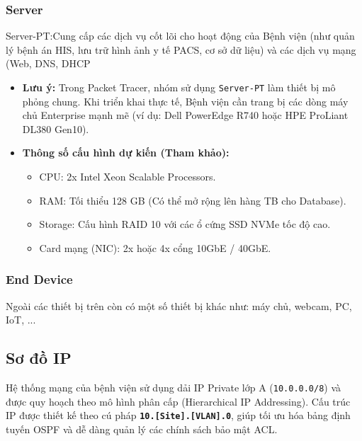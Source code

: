 \subsubsection{Server}
Server-PT:Cung cấp các dịch vụ cốt lõi cho hoạt động của Bệnh viện (như quản lý bệnh án HIS, lưu trữ hình ảnh y tế PACS, cơ sở dữ liệu) và các dịch vụ mạng (Web, DNS, DHCP
\begin{tcolorbox}[
        enhanced,
        colback=white,
        colframe=darkgray,
        coltitle=black,
        fonttitle=\large\bfseries,
        title=Thông số kỹ thuật đề xuất cho Server (Thực tế),
        attach boxed title to top left={xshift=5mm, yshift=-3mm},
        boxed title style={colback=white, colframe=darkgray},
        drop fuzzy shadow,
        top=4mm, bottom=2mm, left=2mm, right=2mm
    ]
        \begin{itemize}
            \item \textbf{Lưu ý:} Trong Packet Tracer, nhóm sử dụng \texttt{Server-PT} làm thiết bị mô phỏng chung. Khi triển khai thực tế, Bệnh viện cần trang bị các dòng máy chủ Enterprise mạnh mẽ (ví dụ: Dell PowerEdge R740 hoặc HPE ProLiant DL380 Gen10).
            \item \textbf{Thông số cấu hình dự kiến (Tham khảo):}
            \begin{itemize}
                \item CPU: 2x Intel Xeon Scalable Processors.
                \item RAM: Tối thiểu 128 GB (Có thể mở rộng lên hàng TB cho Database).
                \item Storage: Cấu hình RAID 10 với các ổ cứng SSD NVMe tốc độ cao.
                \item Card mạng (NIC): 2x hoặc 4x cổng 10GbE / 40GbE.
            \end{itemize}
        \end{itemize}
    \end{tcolorbox}

\subsubsection{End Device}
Ngoài các thiết bị trên còn có một số thiết bị khác như: máy chủ, webcam, PC, IoT, ...  

\subsection{Sơ đồ IP}
Hệ thống mạng của bệnh viện sử dụng dải IP Private lớp A (\texttt{10.0.0.0/8}) và được quy hoạch theo mô hình phân cấp (Hierarchical IP Addressing). Cấu trúc IP được thiết kế theo cú pháp \textbf{\texttt{10.[Site].[VLAN].0}}, giúp tối ưu hóa bảng định tuyến OSPF và dễ dàng quản lý các chính sách bảo mật ACL. 

